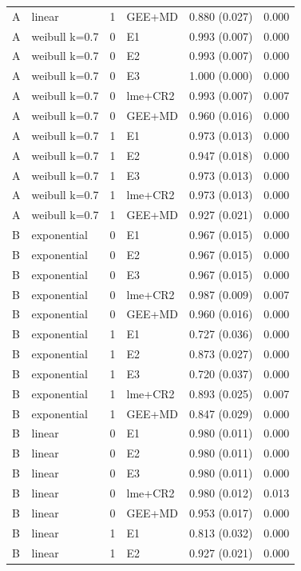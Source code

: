 \documentclass[
  11pt,
]{article}
\begin{document}
\begin{longtable}[t]{llrlll}
A & linear & 1 & GEE+MD & 0.880 (0.027) & 0.000\\
\addlinespace
A & weibull k=0.7 & 0 & E1 & 0.993 (0.007) & 0.000\\
A & weibull k=0.7 & 0 & E2 & 0.993 (0.007) & 0.000\\
A & weibull k=0.7 & 0 & E3 & 1.000 (0.000) & 0.000\\
A & weibull k=0.7 & 0 & lme+CR2 & 0.993 (0.007) & 0.007\\
A & weibull k=0.7 & 0 & GEE+MD & 0.960 (0.016) & 0.000\\
\addlinespace
A & weibull k=0.7 & 1 & E1 & 0.973 (0.013) & 0.000\\
A & weibull k=0.7 & 1 & E2 & 0.947 (0.018) & 0.000\\
A & weibull k=0.7 & 1 & E3 & 0.973 (0.013) & 0.000\\
A & weibull k=0.7 & 1 & lme+CR2 & 0.973 (0.013) & 0.000\\
A & weibull k=0.7 & 1 & GEE+MD & 0.927 (0.021) & 0.000\\
\addlinespace
B & exponential & 0 & E1 & 0.967 (0.015) & 0.000\\
B & exponential & 0 & E2 & 0.967 (0.015) & 0.000\\
B & exponential & 0 & E3 & 0.967 (0.015) & 0.000\\
B & exponential & 0 & lme+CR2 & 0.987 (0.009) & 0.007\\
B & exponential & 0 & GEE+MD & 0.960 (0.016) & 0.000\\
\addlinespace
B & exponential & 1 & E1 & 0.727 (0.036) & 0.000\\
B & exponential & 1 & E2 & 0.873 (0.027) & 0.000\\
B & exponential & 1 & E3 & 0.720 (0.037) & 0.000\\
B & exponential & 1 & lme+CR2 & 0.893 (0.025) & 0.007\\
B & exponential & 1 & GEE+MD & 0.847 (0.029) & 0.000\\
\addlinespace
B & linear & 0 & E1 & 0.980 (0.011) & 0.000\\
B & linear & 0 & E2 & 0.980 (0.011) & 0.000\\
B & linear & 0 & E3 & 0.980 (0.011) & 0.000\\
B & linear & 0 & lme+CR2 & 0.980 (0.012) & 0.013\\
B & linear & 0 & GEE+MD & 0.953 (0.017) & 0.000\\
\addlinespace
B & linear & 1 & E1 & 0.813 (0.032) & 0.000\\
B & linear & 1 & E2 & 0.927 (0.021) & 0.000\\

\end{longtable}
\end{document}
